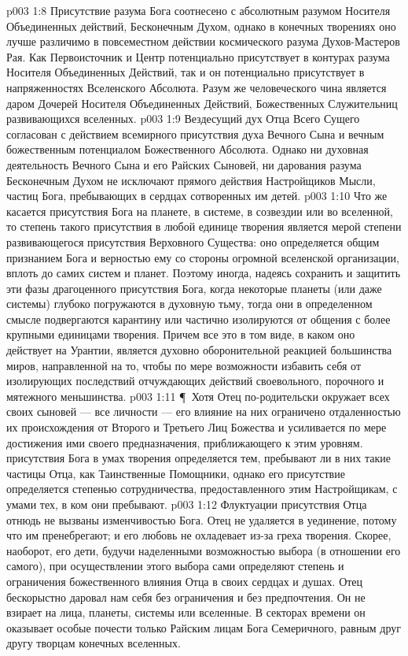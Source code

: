\vs p003 1:8 Присутствие разума Бога соотнесено с абсолютным разумом Носителя Объединенных действий, Бесконечным Духом, однако в конечных творениях оно лучше различимо в повсеместном действии космического разума Духов\hyp{}Мастеров Рая. Как Первоисточник и Центр потенциально присутствует в контурах разума Носителя Объединенных Действий, так и он потенциально присутствует в напряженностях Вселенского Абсолюта. Разум же человеческого чина является даром Дочерей Носителя Объединенных Действий, Божественных Служительниц развивающихся вселенных.
\vs p003 1:9 Вездесущий дух Отца Всего Сущего согласован с действием всемирного присутствия духа Вечного Сына и вечным божественным потенциалом Божественного Абсолюта. Однако ни духовная деятельность Вечного Сына и его Райских Сыновей, ни дарования разума Бесконечным Духом не исключают прямого действия Настройщиков Мысли, частиц Бога, пребывающих в сердцах сотворенных им детей.
\vs p003 1:10 Что же касается присутствия Бога на планете, в системе, в созвездии или во вселенной, то степень такого присутствия в любой единице творения является мерой степени развивающегося присутствия Верховного Существа: оно определяется общим признанием Бога и верностью ему со стороны огромной вселенской организации, вплоть до самих систем и планет. Поэтому иногда, надеясь сохранить и защитить эти фазы драгоценного присутствия Бога, когда некоторые планеты (или даже системы) глубоко погружаются в духовную тьму, тогда они в определенном смысле подвергаются карантину или частично изолируются от общения с более крупными единицами творения. Причем все это в том виде, в каком оно действует на Урантии, является духовно оборонительной реакцией большинства миров, направленной на то, чтобы по мере возможности избавить себя от изолирующих последствий отчуждающих действий своевольного, порочного и мятежного меньшинства.
\vs p003 1:11 \P\ Хотя Отец по\hyp{}родительски окружает всех своих сыновей --- все личности --- его влияние на них ограничено отдаленностью их происхождения от Второго и Третьего Лиц Божества и усиливается по мере достижения ими своего предназначения, приближающего к этим уровням.  присутствия Бога в умах творения определяется тем, пребывают ли в них такие частицы Отца, как Таинственные Помощники, однако его  присутствие определяется степенью сотрудничества, предоставленного этим Настройщикам, с умами тех, в ком они пребывают.
\vs p003 1:12 Флуктуации присутствия Отца отнюдь не вызваны изменчивостью Бога. Отец не удаляется в уединение, потому что им пренебрегают; и его любовь не охладевает из\hyp{}за греха творения. Скорее, наоборот, его дети, будучи наделенными возможностью выбора (в отношении его самого), при осуществлении этого выбора сами определяют степень и ограничения божественного влияния Отца в своих сердцах и душах. Отец бескорыстно даровал нам себя без ограничения и без предпочтения. Он не взирает на лица, планеты, системы или вселенные. В секторах времени он оказывает особые почести только Райским лицам Бога Семеричного, равным друг другу творцам конечных вселенных.
